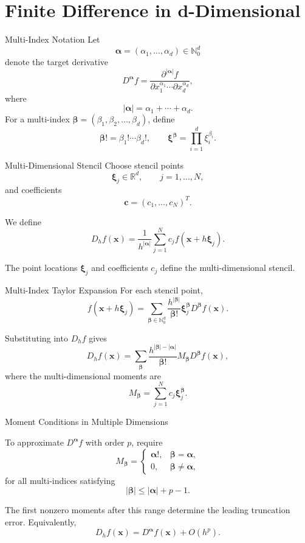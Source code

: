 \documentclass{beamer}
\begin{document}
\section[A2Q3]{Finite Difference in d-Dimensional}
\begin{frame}{Multi-Index Notation}
Let
\[
\boldsymbol{\alpha}
=
(\alpha_1,\ldots,\alpha_d)
\in\mathbb{N}_0^d
\]
denote the target derivative
\[
D^{\boldsymbol{\alpha}}f
=
\frac{\partial^{|\boldsymbol{\alpha}|}f}
{\partial x_1^{\alpha_1}\cdots\partial x_d^{\alpha_d}},
\]
where
\[
|\boldsymbol{\alpha}|
=
\alpha_1+\cdots+\alpha_d.
\]
For a multi-index \(\boldsymbol{\beta}=(\beta_1, \beta_2, \ldots, \beta_d)\), define
\[
\boldsymbol{\beta}!
=
\beta_1!\cdots\beta_d!,
\qquad
\boldsymbol{\xi}^{\boldsymbol{\beta}}
=
\prod_{i=1}^d \xi_i^{\beta_i}.
\]
\end{frame}

\begin{frame}{Multi-Dimensional Stencil}
Choose stencil points
\[
\boldsymbol{\xi}_j\in\mathbb{R}^d,
\qquad j=1,\ldots,N,
\]
and coefficients
\[
\boldsymbol{c}
=
(c_1,\ldots,c_N)^T.
\]

We define
\[
D_hf(\boldsymbol{x})
=
\frac{1}{h^{|\boldsymbol{\alpha}|}}
\sum_{j=1}^N
c_j f(\boldsymbol{x}+h\boldsymbol{\xi}_j).
\]

The point locations \(\boldsymbol{\xi}_j\) and coefficients \(c_j\)
define the multi-dimensional stencil.
\end{frame}


\begin{frame}{Multi-Index Taylor Expansion}
For each stencil point,
\[
f(\boldsymbol{x}+h\boldsymbol{\xi}_j)
=
\sum_{\boldsymbol{\beta}\in\mathbb{N}_0^d}
\frac{h^{|\boldsymbol{\beta}|}}
{\boldsymbol{\beta}!}
\boldsymbol{\xi}_j^{\boldsymbol{\beta}}
D^{\boldsymbol{\beta}}f(\boldsymbol{x}).
\]

Substituting into \(D_hf\) gives
\[
D_hf(\boldsymbol{x})
=
\sum_{\boldsymbol{\beta}}
\frac{h^{|\boldsymbol{\beta}|-|\boldsymbol{\alpha}|}}
{\boldsymbol{\beta}!}
M_{\boldsymbol{\beta}}
D^{\boldsymbol{\beta}}f(\boldsymbol{x}),
\]
where the multi-dimensional moments are
\[
M_{\boldsymbol{\beta}}
=
\sum_{j=1}^N
c_j\boldsymbol{\xi}_j^{\boldsymbol{\beta}}.
\]
\end{frame}

\begin{frame}{Moment Conditions in Multiple Dimensions}

To approximate \(D^{\boldsymbol{\alpha}}f\) with order \(p\), require
\[
M_{\boldsymbol{\beta}}
=
\begin{cases}
\boldsymbol{\alpha}!,
&
\boldsymbol{\beta}=\boldsymbol{\alpha},\\
0,
&
\boldsymbol{\beta}\neq\boldsymbol{\alpha},
\end{cases}
\]
for all multi-indices satisfying
\[
|\boldsymbol{\beta}|
\leq
|\boldsymbol{\alpha}|+p-1.
\]

The first nonzero moments after this range determine the
leading truncation error. Equivalently,
\[
D_hf(\boldsymbol{x})
=
D^{\boldsymbol{\alpha}}f(\boldsymbol{x})
+
O(h^p).
\]
\end{frame}
\end{document}
